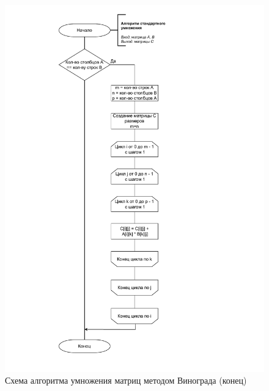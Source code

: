 \begin{figure}[h]
	\centering
	\includegraphics[height=0.9\textheight, page=3]{img/algorithms.pdf}
	\caption{Схема алгоритма умножения матриц методом Винограда (конец)}
	\label{fig:Vinograd2}
\end{figure}

\clearpage

